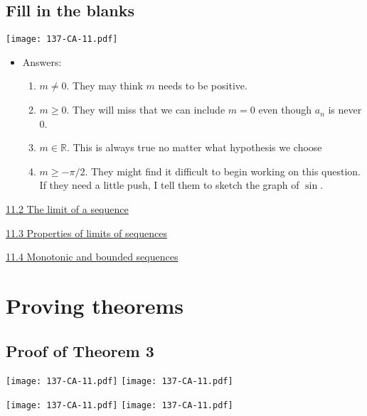 \documentclass[11pt]{article}
\newcommand{\R}{\mathbb{R}}
\newcommand{\nl}{\hfill \vspace{-1.1\baselineskip}} %
\newcommand{\vii}{\hspace{8mm} \href{https://www.youtube.com/watch?v=Dr8LzBA-H84&list=PLlwePzQY_wW_yFyXauToZNFNhhufzioP2&index=2}{11.2 The limit of a sequence}}
\newcommand{\viii}{\hspace{8mm} \href{https://www.youtube.com/watch?v=xuNRMkzSzZY&list=PLlwePzQY_wW_yFyXauToZNFNhhufzioP2&index=3}{11.3 Properties of limits of sequences}}
\newcommand{\viv}{\hspace{8mm} \href{https://www.youtube.com/watch?v=J8uZJ9by0ys&list=PLlwePzQY_wW_yFyXauToZNFNhhufzioP2&index=4}{11.4 Monotonic and bounded sequences}}
\begin{document}
\newpage
\subsection{Fill in the blanks}

\begin{center}
{ \texttt{[image: 137-CA-11.pdf]}} 
\end{center}

\begin{comments}
\nl
	\begin{itemize}
		\item  Answers:
			\begin{enumerate}
				\item $m \neq 0$. They may think $m$ needs to be positive.
				\item $m \geq 0$. They will miss that we can include $m=0$ even though $a_n$ is never 0.
				\item $m \in \R$. This is always true no matter what hypothesis we choose
				\item  $m \geq - \pi/2$. They might find it difficult to begin working on this question.  If they need a little push, I tell them to sketch the graph of $\sin$.
			\end{enumerate}
	\end{itemize}
\end{comments}

\begin{videos}
\vii

\viii

\viv
\end{videos}

\newpage
\section{Proving theorems}
\subsection{Proof of Theorem 3}

\begin{center}
{ \texttt{[image: 137-CA-11.pdf]}} \quad
{ \texttt{[image: 137-CA-11.pdf]}} 

{ \texttt{[image: 137-CA-11.pdf]}}  \quad
{ \texttt{[image: 137-CA-11.pdf]}} 
\end{center}
\end{document}
